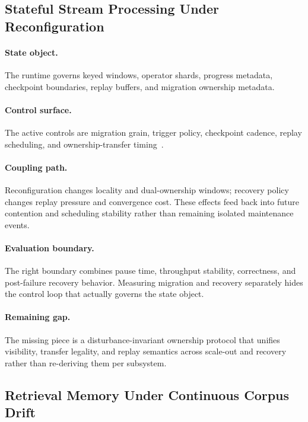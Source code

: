 \subsection{Stateful Stream Processing Under Reconfiguration}

\paragraph{State object.}
The runtime governs keyed windows, operator shards, progress metadata, checkpoint boundaries, replay buffers, and migration ownership metadata.

\paragraph{Control surface.}
The active controls are migration grain, trigger policy, checkpoint cadence, replay scheduling, and ownership-transfer timing~\cite{akidau2013millwheel,carbone2015flink,nasir2019megaphone,zhao2024recovery,mao2025spacker}.

\paragraph{Coupling path.}
Reconfiguration changes locality and dual-ownership windows; recovery policy changes replay pressure and convergence cost. These effects feed back into future contention and scheduling stability rather than remaining isolated maintenance events.

\paragraph{Evaluation boundary.}
The right boundary combines pause time, throughput stability, correctness, and post-failure recovery behavior. Measuring migration and recovery separately hides the control loop that actually governs the state object.

\paragraph{Remaining gap.}
The missing piece is a disturbance-invariant ownership protocol that unifies visibility, transfer legality, and replay semantics across scale-out and recovery rather than re-deriving them per subsystem.

\subsection{Retrieval Memory Under Continuous Corpus Drift}

